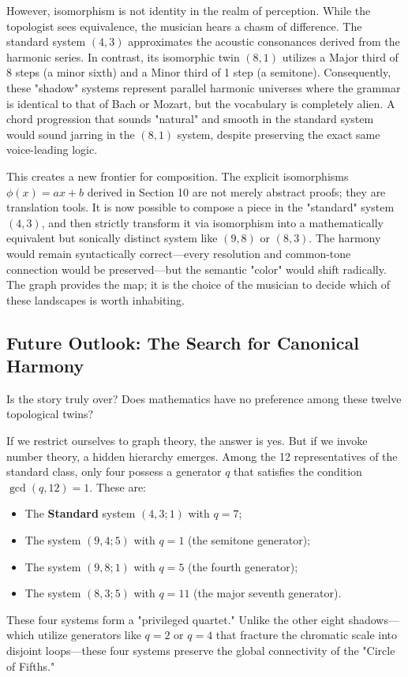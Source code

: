 \documentclass[12pt,letterpaper]{amsart}
\begin{document}
However, isomorphism is not identity in the realm of perception. While the topologist sees equivalence, the musician hears a chasm of difference. The standard system $(4,3)$ approximates the acoustic consonances derived from the harmonic series. In contrast, its isomorphic twin $(8,1)$ utilizes a Major third of 8 steps (a minor sixth) and a Minor third of 1 step (a semitone). Consequently, these "shadow" systems represent parallel harmonic universes where the grammar is identical to that of Bach or Mozart, but the vocabulary is completely alien. A chord progression that sounds "natural" and smooth in the standard system would sound jarring in the $(8,1)$ system, despite preserving the exact same voice-leading logic.

This creates a new frontier for composition. The explicit isomorphisms $\phi(x) = ax+b$ derived in Section 10 are not merely abstract proofs; they are translation tools. It is now possible to compose a piece in the "standard" system $(4,3)$, and then strictly transform it via isomorphism into a mathematically equivalent but sonically distinct system like $(9,8)$ or $(8,3)$. The harmony would remain syntactically correct—every resolution and common-tone connection would be preserved—but the semantic "color" would shift radically. The graph provides the map; it is the choice of the musician to decide which of these landscapes is worth inhabiting.

\subsection{Future Outlook: The Search for Canonical Harmony}

Is the story truly over? Does mathematics have no preference among these twelve topological twins? 

If we restrict ourselves to graph theory, the answer is yes. But if we invoke number theory, a hidden hierarchy emerges. Among the 12 representatives of the standard class, only four possess a generator $q$ that satisfies the condition $\gcd(q, 12)=1$. These are:
\begin{itemize}
    \item The \textbf{Standard} system $(4,3; 1)$ with $q=7$;
    \item The system $(9,4; 5)$ with $q=1$ (the semitone generator);
    \item The system $(9,8; 1)$ with $q=5$ (the fourth generator);
    \item The system $(8,3; 5)$ with $q=11$ (the major seventh generator).
\end{itemize}
These four systems form a "privileged quartet." Unlike the other eight shadows—which utilize generators like $q=2$ or $q=4$ that fracture the chromatic scale into disjoint loops—these four systems preserve the global connectivity of the "Circle of Fifths." 
\end{document}
